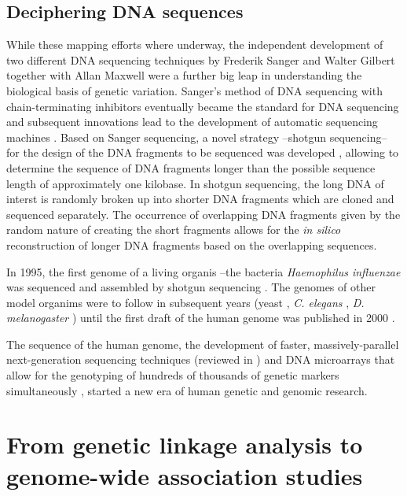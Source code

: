 \subsection{Deciphering DNA sequences}
While these mapping efforts where underway, the independent development of two different DNA sequencing techniques by Frederik Sanger and Walter Gilbert together with Allan Maxwell were a further big leap in understanding the biological basis of genetic variation. Sanger's method of DNA sequencing with chain-terminating inhibitors eventually became the standard for DNA sequencing and subsequent innovations lead to the development of automatic sequencing machines \citep{Hunkapiller1991}. Based on Sanger sequencing, a novel strategy --shotgun sequencing-- for the design of the DNA fragments to be sequenced was developed \citep{Staden1979,Anderson1981}, allowing to determine the sequence of DNA fragments longer than the possible sequence length of approximately one kilobase.  In shotgun sequencing, the long DNA of interst is randomly broken up into shorter DNA fragments which are cloned and sequenced separately. The occurrence of overlapping DNA fragments given by the random nature of creating the short fragments allows for the \textit{in silico} reconstruction of longer DNA fragments based on the overlapping sequences. 

In 1995, the first genome of a living organis --the bacteria \textit{Haemophilus influenzae} was sequenced and assembled by shotgun sequencing \citep{Fleischmann1995}. The genomes of other model organims were to follow in subsequent years (yeast \citep{Goffeau1996}, \textit{C. elegans} \citep{C.elegans1998}, \textit{D. melanogaster} \citep{Adams2000}) until the first draft of the human genome was published in 2000 \citep{Lander2000}. 

The sequence of the human genome, the development of faster, massively-parallel next-generation sequencing techniques (reviewed in \citep{Shendure2008,Heather2016}) and DNA microarrays that allow for the genotyping of hundreds of thousands of genetic markers simultaneously \citep{Wang1998}, started a new era of human genetic and genomic research. 

\section{From genetic linkage analysis to genome-wide association studies}
